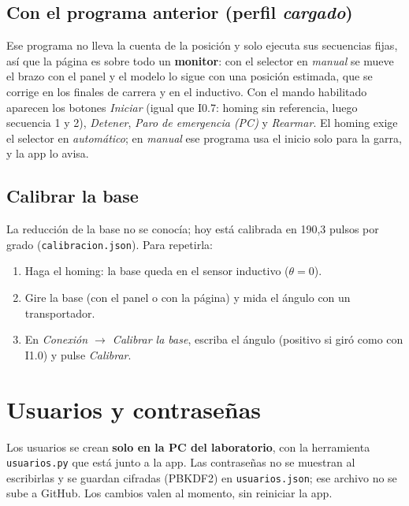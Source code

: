 \documentclass[a4paper,11pt]{article}
\newcommand{\codigo}[1]{\texttt{#1}}
\begin{document}
\subsection{Con el programa anterior (perfil \emph{cargado})}
Ese programa no lleva la cuenta de la posición y solo ejecuta sus secuencias fijas, así que la página es sobre todo un \textbf{monitor}: con el selector en \emph{manual} se mueve el brazo con el panel y el modelo lo sigue con una posición estimada, que se corrige en los finales de carrera y en el inductivo. Con el mando habilitado aparecen los botones \emph{Iniciar} (igual que I0.7: homing sin referencia, luego secuencia 1 y 2), \emph{Detener}, \emph{Paro de emergencia (PC)} y \emph{Rearmar}. El homing exige el selector en \emph{automático}; en \emph{manual} ese programa usa el inicio solo para la garra, y la app lo avisa.

\subsection{Calibrar la base}\label{sec:calibrar}
La reducción de la base no se conocía; hoy está calibrada en 190,3 pulsos por grado (\codigo{calibracion.json}). Para repetirla:
\begin{enumerate}
\item Haga el homing: la base queda en el sensor inductivo ($\theta = 0$).
\item Gire la base (con el panel o con la página) y mida el ángulo con un transportador.
\item En \emph{Conexión $\rightarrow$ Calibrar la base}, escriba el ángulo (positivo si giró como con I1.0) y pulse \emph{Calibrar}.
\end{enumerate}

\section{Usuarios y contraseñas}\label{sec:usuarios}

Los usuarios se crean \textbf{solo en la PC del laboratorio}, con la herramienta \codigo{usuarios.py} que está junto a la app. Las contraseñas no se muestran al escribirlas y se guardan cifradas (PBKDF2) en \codigo{usuarios.json}; ese archivo no se sube a GitHub. Los cambios valen al momento, sin reiniciar la app.
\end{document}
